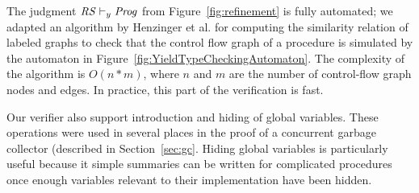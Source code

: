 The judgment $\mathit{RS} \vdash_y \mathit{Prog}$ from Figure~\ref{fig:refinement} is fully automated;
we adapted an algorithm by Henzinger et al.\cite{HenzingerHK95} for computing the similarity relation of 
labeled graphs to check that the control flow graph of a procedure is simulated by
the automaton in Figure~\ref{fig:YieldTypeCheckingAutomaton}.
The complexity of the algorithm is $O(n*m)$, where $n$ and $m$ are the number of control-flow graph nodes and edges.
In practice, this part of the verification is fast.

Our verifier also support introduction and hiding of global variables.
These operations were used in several places in the proof of a concurrent garbage collector (described in Section~\ref{sec:gc}.
Hiding global variables is particularly useful because it simple summaries can be written for complicated procedures
once enough variables relevant to their implementation have been hidden.

